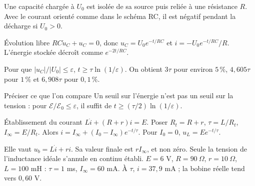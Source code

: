 Une capacité chargée à $U_0$ est isolée de sa source puis reliée à une résistance $R$. Avec le courant orienté comme dans le schéma RC, il est négatif pendant la décharge si $U_0>0$.
\begin{loi}{Évolution libre}
$RC\dot u_C+u_C=0$, donc $u_C=U_0e^{-t/RC}$ et $i=-U_0e^{-t/RC}/R$. L’énergie stockée décroît comme $e^{-2t/RC}$.
\end{loi}
Pour que $|u_C|/|U_0|\leq\varepsilon$, $t\geq\tau\ln(1/\varepsilon)$. On obtient $3\tau$ pour environ $5\,\%$, $4{,}605\tau$ pour $1\,\%$ et $6{,}908\tau$ pour $0{,}1\,\%$.
\begin{piege}{Préciser ce que l’on compare}
Un seuil sur l’énergie n’est pas un seuil sur la tension : pour $\mathcal E/\mathcal E_0\leq\varepsilon$, il suffit de $t\geq(\tau/2)\ln(1/\varepsilon)$.
\end{piege}


\begin{loi}{Établissement du courant}
$L\dot i+(R+r)i=E$. Poser $R_t=R+r$, $\tau=L/R_t$, $I_\infty=E/R_t$. Alors $i=I_\infty+(I_0-I_\infty)e^{-t/\tau}$. Pour $I_0=0$, $u_L=Ee^{-t/\tau}$.
\end{loi}
Elle vaut $u_b=L\dot i+ri$. Sa valeur finale est $rI_\infty$, et non zéro. Seule la tension de l’inductance idéale s’annule en continu établi.
$E=6$ V, $R=90\ \Omega$, $r=10\ \Omega$, $L=100$ mH : $\tau=1$ ms, $I_\infty=60$ mA. À $\tau$, $i=37{,}9$ mA ; la bobine réelle tend vers $0{,}60$ V.


